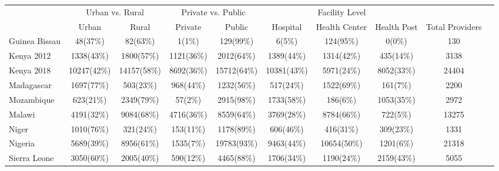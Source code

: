 \def\sym#1{\ifmmode^{#1}\else\(^{#1}\)\fi}
\begin{tabular}{l*{9}{c}}
\hline\hline
&\multicolumn{2}{c}{Urban vs. Rural} &\multicolumn{2}{c}{Private vs. Public}  &\multicolumn{3}{c}{Facility Level}    \\\cmidrule(lr){2-3}\cmidrule(lr){4-5}\cmidrule(lr){6-8}
&\multicolumn{1}{c}{Urban}&\multicolumn{1}{c}{Rural}&\multicolumn{1}{c}{Private}&\multicolumn{1}{c}{Public}&\multicolumn{1}{c}{Hospital}&\multicolumn{1}{c}{Health Center}&\multicolumn{1}{c}{Health Post}&\multicolumn{1}{c}{Total Providers}&\\
\hline
Guinea Bissau&         {48(37\%)}&        {82(63\%)}&    {1(1\%)}&        {129(99\%)}&    {6(5\%)}&               {124(95\%)}&             {0(0\%)}&             {130}\\
Kenya 2012&            {1338(43\%)}&        {1800(57\%)}&    {1121(36\%)}&        {2012(64\%)}&    {1389(44\%)}&               {1314(42\%)}&             {435(14\%)}&             {3138}\\
Kenya 2018&        {10247(42\%)}&    {14157(58\%)}&    {8692(36\%)}&    {15712(64\%)}&        {10381(43\%)}&               {5971(24\%)}&             {8052(33\%)}&             {24404}\\
Madagascar&        {1697(77\%)}&    {503(23\%)}&    {968(44\%)}&    {1232(56\%)}&        {517(24\%)}&               {1522(69\%)}&             {161(7\%)}&             {2200}\\
Mozambique&        {623(21\%)}&    {2349(79\%)}&    {57(2\%)}&    {2915(98\%)}&        {1733(58\%)}&               {186(6\%)}&             {1053(35\%)}&             {2972}\\
Malawi&                {4191(32\%)}&        {9084(68\%)}&    {4716(36\%)}&    {8559(64\%)}&        {3769(28\%)}&               {8784(66\%)}&             {722(5\%)}&             {13275}\\
Niger&                 {1010(76\%)}&        {321(24\%)}&    {153(11\%)}&    {1178(89\%)}&        {606(46\%)}&               {416(31\%)}&             {309(23\%)}&             {1331}\\
Nigeria&               {5689(39\%)}&        {8956(61\%)}&    {1535(7\%)}&    {19783(93\%)}&        {9463(44\%)}&               {10654(50\%)}&             {1201(6\%)}&             {21318}\\
Sierra Leone&      {3050(60\%)}&    {2005(40\%)}&    {590(12\%)}&    {4465(88\%)}&        {1706(34\%)}&               {1190(24\%)}&             {2159(43\%)}&             {5055}\\

\end{tabular}
